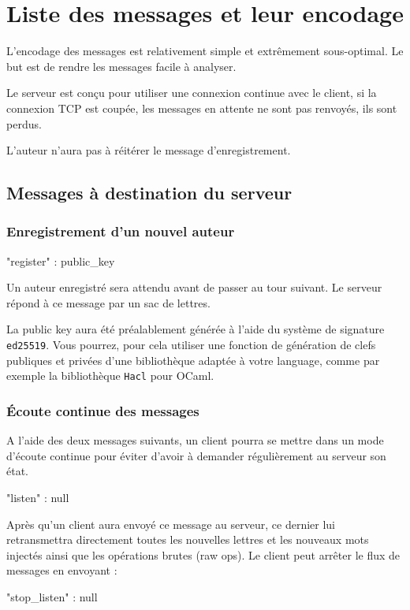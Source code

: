 \documentclass{article}
\begin{document}
\section{Liste des messages et leur encodage}
\label{sec:liste-des-messages}

L'encodage des messages est relativement simple et extrêmement
sous-optimal. Le but est de rendre les messages facile à analyser.

Le serveur est conçu pour utiliser une connexion continue avec le
client, si la connexion TCP est coupée, les messages en attente ne
sont pas renvoyés, ils sont perdus.

L'auteur n'aura pas à réitérer le message d'enregistrement.

\subsection{Messages à destination du serveur}
\label{sec:mess-vers-serv}

\subsubsection{Enregistrement d'un nouvel auteur}
\label{sec:register}

\begin{jsonMessage}
  { "register" : public_key }
\end{jsonMessage}
Un auteur enregistré sera attendu avant de passer au tour suivant. Le
serveur répond à ce message par un sac de lettres.

La public key aura
été préalablement générée à l'aide du système de signature
\texttt{ed25519}. Vous pourrez, pour cela utiliser une fonction de
génération de clefs publiques et privées d'une bibliothèque adaptée à
votre language, comme par exemple la bibliothèque \texttt{Hacl} pour
OCaml.

\subsubsection{Écoute continue des messages}

A l'aide des deux messages suivants, un client pourra se mettre dans
un mode d'écoute continue pour éviter d'avoir à demander régulièrement
au serveur son état.

\label{sec:ecoute-continue}
\begin{jsonMessage}
  { "listen" : null }
\end{jsonMessage}
Après qu'un client aura envoyé ce message au serveur, ce dernier lui
retransmettra directement toutes les nouvelles lettres et les nouveaux
mots injectés ainsi que les opérations brutes (raw ops).  Le client
peut arrêter le flux de messages en envoyant :
\begin{jsonMessage}
  { "stop_listen" : null }
\end{jsonMessage}
\end{document}
